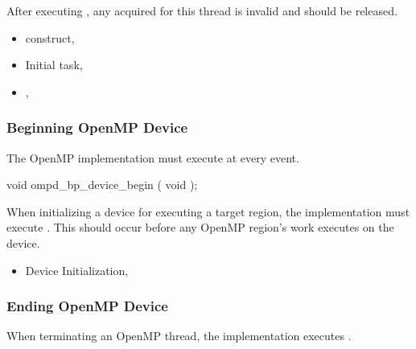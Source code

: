 After 
executing , any  acquired for this thread 
is invalid and should be released.


\crossreferences
\begin{itemize}
\item
   construct, 
\item
  Initial task, 
\item
  , 
\end{itemize}






\subsubsection{Beginning OpenMP Device}
\label{subsubsec:ompd_bp_device_begin}

\summary
The OpenMP implementation must execute 
 at every  event.


\format
\begin{cspecific}
\begin{ompSyntax}
void ompd_bp_device_begin ( void );
\end{ompSyntax}
\end{cspecific}


\descr

When initializing a device for executing a target region, the implementation must 
execute .
This should occur before any OpenMP region's work executes on the device.

\crossreferences
\begin{itemize}
\item
  Device Initialization, 
\end{itemize}





\subsubsection{Ending OpenMP Device}
\label{subsubsec:ompd_bp_device_end}

\summary

When terminating an OpenMP thread, the implementation 
executes .

